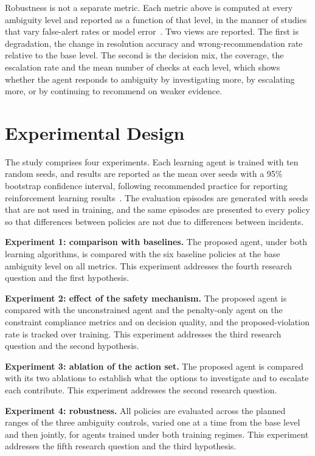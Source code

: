 \documentclass[12pt,a4paper]{article}
\begin{document}
Robustness is not a separate metric. Each metric above is computed at every ambiguity level and reported as a function of that level, in the manner of studies that vary false-alert rates or model error~\cite{kim2025,hammar2025}. Two views are reported. The first is degradation, the change in resolution accuracy and wrong-recommendation rate relative to the base level. The second is the decision mix, the coverage, the escalation rate and the mean number of checks at each level, which shows whether the agent responds to ambiguity by investigating more, by escalating more, or by continuing to recommend on weaker evidence.

\section{Experimental Design}
\label{sec:experiments}

The study comprises four experiments. Each learning agent is trained with ten random seeds, and results are reported as the mean over seeds with a 95\% bootstrap confidence interval, following recommended practice for reporting reinforcement learning results~\cite{agarwal2021}. The evaluation episodes are generated with seeds that are not used in training, and the same episodes are presented to every policy so that differences between policies are not due to differences between incidents.

\textbf{Experiment 1: comparison with baselines.} The proposed agent, under both learning algorithms, is compared with the six baseline policies at the base ambiguity level on all metrics. This experiment addresses the fourth research question and the first hypothesis.

\textbf{Experiment 2: effect of the safety mechanism.} The proposed agent is compared with the unconstrained agent and the penalty-only agent on the constraint compliance metrics and on decision quality, and the proposed-violation rate is tracked over training. This experiment addresses the third research question and the second hypothesis.

\textbf{Experiment 3: ablation of the action set.} The proposed agent is compared with its two ablations to establish what the options to investigate and to escalate each contribute. This experiment addresses the second research question.

\textbf{Experiment 4: robustness.} All policies are evaluated across the planned ranges of the three ambiguity controls, varied one at a time from the base level and then jointly, for agents trained under both training regimes. This experiment addresses the fifth research question and the third hypothesis.
\end{document}
